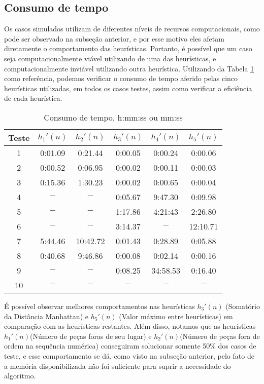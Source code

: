 \documentclass[12pt]{article}
\begin{document}
\subsection{Consumo de tempo}

Os casos simulados utilizam de diferentes níveis de recursos computacionais, como pode ser observado na subseção anterior, e por esse motivo eles afetam diretamente o comportamento das heurísticas. Portanto, é possível que um caso seja computacionalmente viável utilizando de uma das heurísticas, e computacionalmente inviável utilizando outra heurística. Utilizando da Tabela \ref{tab:tabtemp} como referência, podemos verificar o consumo de tempo aferido pelas cinco heurísticas utilizadas, em todos os casos testes, assim como verificar a eficiência de cada heurística. 

\begin{table}[H]
    \centering
    \begin{tabular}{cccccc}
        \hline
        \textbf{Teste} & $h_{1}'(n)$ & $h_{2}'(n)$ & $h_{3}'(n)$ & $h_{4}'(n)$ & $h_{5}'(n)$\\ \hline
        1 & 0:01.09 & 0:21.44 & 0:00.05 & 0:00.24 & 0:00.06 \\ \hline
        2 & 0:00.52 & 0:06.95 & 0:00.02 & 0:00.11 & 0:00.03 \\ \hline
        3 & 0:15.36 & 1:30.23 & 0:00.02 & 0:00.65 & 0:00.04 \\ \hline
        4 & $-$ & $-$ & 0:05.67 & 9:47.30 & 0:09.98 \\ \hline
        5 & $-$ & $-$ & 1:17.86 & 4:21:43 & 2:26.80 \\ \hline
        6 & $-$ & $-$ & 3:14.37 & $-$ & 12:10.71 \\ \hline
        7 & 5:44.46 & 10:42.72 & 0:01.43 & 0:28.89 & 0:05.88 \\ \hline
        8 & 0:40.68 & 9:46.86 & 0:00.08 & 0:02.14 & 0:00.16 \\ \hline
        9 & $-$ & $-$ & 0:08.25 & 34:58.53 & 0:16.40 \\ \hline
        10 & $-$ & $-$ & $-$ & $-$ & $-$ \\ \hline
    \end{tabular}
    \caption{Consumo de tempo, h:mm:ss ou mm:ss}
    \label{tab:tabtemp}
\end{table}

É possível observar melhores comportamentos nas heurísticas $h_{3}'(n)$ (Somatório da Distância Manhattan) e $h_{5}'(n)$ (Valor máximo entre heurísticas) em comparação com as heurísticas restantes. Além disso, notamos que as heurísticas $h_{1}'(n)$(Número de peças foras de seu lugar) e $h_{2}'(n)$(Número de peças fora de ordem na sequência numérica) conseguiram solucionar somente 50\% dos casos de teste, e esse comportamento se dá, como visto na subseção anterior, pelo fato de a memória disponibilizada não foi suficiente para suprir a necessidade do algoritmo.
\end{document}
